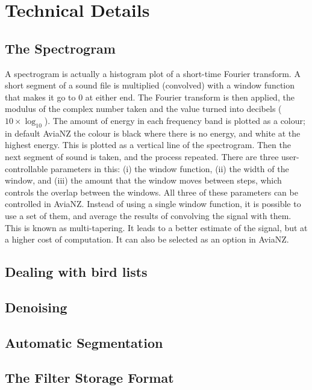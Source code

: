 \documentclass{article}
\begin{document}
%
%
%
\section{Technical Details}

\subsection{The Spectrogram}\label{sec:spectrogram}

A spectrogram is actually a histogram plot of a short-time Fourier transform. A short segment of a sound file is multiplied (convolved) with a window function that makes it go to 0 at either end. The Fourier transform is then applied, the modulus  of the complex number taken and the value turned into decibels ($10 \times \log_10$). The amount of energy in each frequency band is plotted as a colour; in default AviaNZ the colour is black where there is no energy, and white at the highest energy. This is plotted as a vertical line of the spectrogram. Then the next segment of sound is taken, and the process repeated. There are three user-controllable parameters in this: (i) the window function, (ii) the width of the window, and (iii) the amount that the window moves between steps, which controls the overlap between the windows. All three of these parameters can be controlled in AviaNZ. Instead of using a single window function, it is possible to use a set of them, and average the results of convolving the signal with them. This is known as multi-tapering. It leads to a better estimate of the signal, but at a higher cost of computation. It can also be selected as an option in AviaNZ.

\subsection{Dealing with bird lists}\label{sec:birdlists}
%
%
\subsection{Denoising}\label{sec:denoising}

\subsection{Automatic Segmentation}\label{sec:segmentation}

\subsection{The Filter Storage Format}

\end{document}
